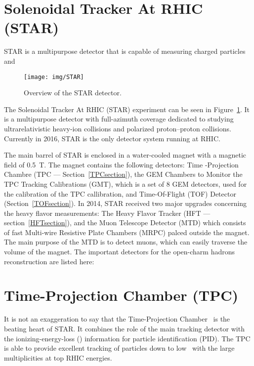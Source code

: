 \section{Solenoidal Tracker At RHIC (STAR)}

STAR is a multipurpose detector that is capable of measuring charged particles and 

\begin{figure}[htb]
\begin{center}
 \texttt{[image: img/STAR]}\\
\end{center}
\caption{\label{STAR}Overview of the STAR detector.}
\end{figure}

The Solenoidal Tracker At RHIC (STAR) experiment \cite{STARoverview} can be seen in Figure~\ref{STAR}. It is a multipurpose detector with full-azimuth
coverage dedicated to
studying ultrarelativistic heavy-ion collisions and polarized proton--proton collisions. Currently in 2016, STAR is the
only detector system running at RHIC\@.

The main barrel of STAR is enclosed in a water-cooled magnet with a magnetic field of \SI{0.5}{\tesla}. The magnet contains the
following detectors: Time -Projection Chambre (TPC --- Section~\ref{TPCsection}), the GEM
Chambers to Monitor the TPC Tracking Calibrations (GMT), 
which is a set of 8 GEM detectors, used for the calibration of the TPC callibration, and Time-Of-Flight
(TOF) Detector (Section~\ref{TOFsection}). In 2014, STAR received two major upgrades
concerning the heavy flavor measurements: The Heavy Flavor Tracker (HFT --- section~\ref{HFTsection}), and the Muon Telescope Detector (MTD) which consists of fast Multi-wire Resistive Plate Chambers (MRPC) palced
outside the magnet. The main purpose of the MTD is to detect muons, which can easily traverse the volume of the magnet. The important
detectors for the open-charm hadrons reconstruction are listed here:

\section{Time-Projection Chamber (TPC)\label{TPCsection}} 
It is not an exaggeration to say that the Time-Projection Chamber~\cite{TpcNim} is the beating heart of STAR. It combines the role of the main tracking detector with the ionizing-energy-loss
(\dedx) information for particle identification (PID). The TPC is able to provide excellent tracking of particles down to low \pt\ with the large multiplicities at top RHIC energies.


